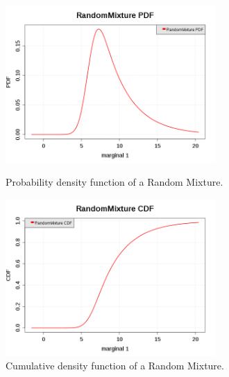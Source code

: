 \begin{figure}[H]
  \begin{minipage}{8cm}
    \begin{center}
      \includegraphics[width=8cm]{RandomMixture_pdf.png}
      \caption{Probability density function of a Random Mixture.}
      \label{PDFRandomMixture}
    \end{center}
  \end{minipage}
  \hfill
  \begin{minipage}{8cm}
    \begin{center}
      \includegraphics[width=8cm]{RandomMixture_cdf.png}
      \caption{Cumulative density function of a Random Mixture.}
      \label{CDFRandomMixture}
    \end{center}
  \end{minipage}
\end{figure}

